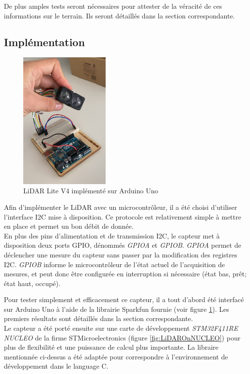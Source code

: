 De plus amples tests seront nécessaires pour attester de la véracité de ces informations sur le
terrain. Ils seront détaillés dans la section correspondante.

\subsection{Implémentation}

\begin{figure}[H]
    \centering
    \includegraphics[width=0.4\textwidth]{Images/LiDAR/LiDAROnArduino.jpeg}
    \caption{LiDAR Lite V4 implémenté sur Arduino Uno}
    \label{fig:LiDAROnArduino}
\end{figure}

Afin d'implémenter le LiDAR avec un microcontrôleur, il a été choisi d'utiliser l'interface I2C
mise à disposition. Ce protocole est relativement simple à mettre en place et permet un bon débit de
donnée.\\
En plus des pins d'alimentation et de transmission I2C, le capteur met à disposition deux ports GPIO,
dénommés \emph{GPIOA} et \emph{GPIOB}. \emph{GPIOA} permet de déclencher une mesure du capteur sans
passer par la modification des registres I2C. \emph{GPIOB} informe le microcontrôleur de l'état actuel
de l'acquisition de mesures, et peut donc être configurée en interruption si nécessaire (état bas, prêt;
état haut, occupé).\par
Pour tester simplement et efficacement ce capteur, il a tout d'abord été interfacé sur Arduino Uno
à l'aide de la librairie Sparkfun fournie (voir figure \ref{fig:LiDAROnArduino}). Les premiers résultats 
sont détaillés dans la section correspondante.\\
Le capteur a été porté ensuite sur une carte de développement \emph{STM32F411RE NUCLEO} de la firme 
STMicroelectronics (figure \ref{fig:LiDAROnNUCLEO}) pour plus de flexibilité et une puissance de calcul plus importante. La libraire
mentionnée ci-dessus a été adaptée pour correspondre à l'environnement de développement dans le language
C.

